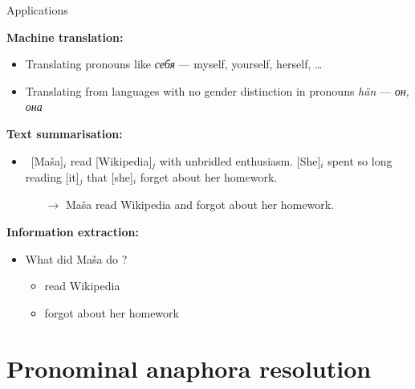 \documentclass[dvipsnames, 10pt, compress]{beamer}
\begin{document}
\begin{frame}{Applications}

\textbf{Machine translation:}
\begin{itemize}
  \item Translating pronouns like \emph{себя} --- myself, yourself, herself, \ldots
  \item Translating from languages with no gender distinction in pronouns \emph{hän} --- \emph{он, она}
\end{itemize}

\textbf{Text summarisation:}
\begin{itemize}
  \item ~[Maša]$_i$ read [Wikipedia]$_j$ with unbridled enthusiasm. [She]$_i$ spent so long reading [it]$_j$ that [she]$_i$ 
     forget about her homework. 
     \begin{itemize}
        \item[$\rightarrow$] Maša read Wikipedia and forgot about her homework.
     \end{itemize}
\end{itemize}
\textbf{Information extraction:}
\begin{itemize}
  \item What did Maša do ? 
  \begin{itemize}
    \item read Wikipedia
    \item forgot about her homework
  \end{itemize}
\end{itemize}

\end{frame}


\section{Pronominal anaphora resolution}

\begin{frame}


\end{frame}
\end{document}
